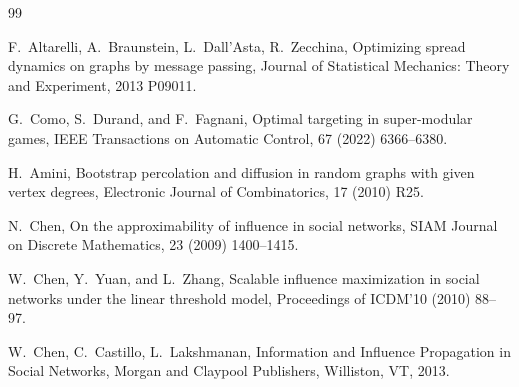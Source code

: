 \documentclass[12pt,twoside,reqno]{amsart}
\theoremstyle{definition}
\numberwithin{equation}{section}
\newcommand{\0}{\mathbf{0}}
\newcommand{\1}{\mathbf{1}}
\begin{document}
\begin{thebibliography}{99}%

F.~Altarelli, A.~Braunstein, L.~Dall'Asta, R.~Zecchina, Optimizing spread dynamics on graphs by message passing, Journal of Statistical Mechanics: Theory and Experiment, 2013 P09011.

%
%
%
%
%
%

G.~Como, S.~Durand, and F.~Fagnani, Optimal targeting in super-modular games, IEEE Transactions on Automatic Control, 67 (2022) 6366--6380.

H.~Amini, Bootstrap percolation and diffusion in random graphs with given vertex degrees,  Electronic Journal of Combinatorics, 17  (2010) R25.

N.~Chen, On the approximability of influence in social networks, SIAM Journal on Discrete Mathematics, 23 (2009) 1400--1415.

W.~Chen, Y.~Yuan, and L.~Zhang, Scalable influence maximization in social networks under the linear threshold model, Proceedings of ICDM'10 (2010) 88--97.

 W.~Chen, C.~Castillo, L.~Lakshmanan, Information and Influence Propagation in Social Networks, Morgan and Claypool Publishers, Williston, VT, 2013.


\end{thebibliography}
\end{document}
